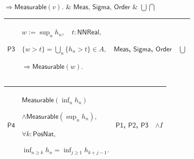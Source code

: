 \documentclass[11pt]{amsart}
\newlength{\FTCOneColumnBody}
\newlength{\FTCFourColumnBody}
\begin{document}
{\begin{tabular}
$\displaystyle \Rightarrow\textsf{Measurable}(v).$ & \hyperlink{def:Meas}{$\displaystyle \textsf{Meas}$}, \hyperlink{ax:Sigma}{$\displaystyle \textsf{Sigma}$}, \hyperlink{ax:Order}{$\displaystyle \textsf{Order}$} & $\displaystyle \bigcup\bigcap$\\ \hline
\end{tabular}%
\par\setlength{\parskip}{0pt}\nointerlineskip
\noindent
\begin{tabular}{|@{}>{\centering\arraybackslash}m{0.078431\FTCFourColumnBody}|>{\centering\arraybackslash}m{0.535947\FTCFourColumnBody}|>{\centering\arraybackslash}m{0.281045\FTCFourColumnBody}|>{\centering\arraybackslash}m{0.104575\FTCFourColumnBody}|}\hline
\hypertarget{proof:P3}{$\displaystyle \textsf{P3}$} & $\displaystyle w:=\sup_nh_n,\quad t:\textsf{NNReal},$\par
$\displaystyle \{w>t\}=\bigcup_n\{h_n>t\}\in A,$\par
$\displaystyle \Rightarrow\textsf{Measurable}(w).$ & \hyperlink{def:Meas}{$\displaystyle \textsf{Meas}$}, \hyperlink{ax:Sigma}{$\displaystyle \textsf{Sigma}$}, \hyperlink{ax:Order}{$\displaystyle \textsf{Order}$} & $\displaystyle \bigcup$\\ \hline
\end{tabular}%
\par\setlength{\parskip}{0pt}\nointerlineskip
\noindent
\begin{tabular}{|@{}>{\centering\arraybackslash}m{0.078431\FTCFourColumnBody}|>{\centering\arraybackslash}m{0.535947\FTCFourColumnBody}|>{\centering\arraybackslash}m{0.281045\FTCFourColumnBody}|>{\centering\arraybackslash}m{0.104575\FTCFourColumnBody}|}\hline
\hypertarget{proof:P4}{$\displaystyle \textsf{P4}$} & $\displaystyle \textsf{Measurable}(\inf_nh_n)$\par
$\displaystyle \land\textsf{Measurable}(\sup_nh_n),$\par
$\displaystyle \forall k:\textsf{PosNat},$\par
$\displaystyle \inf_{n\ge k}h_n=\inf_{j\ge1}h_{k+j-1}.$ & \hyperlink{proof:P1}{$\displaystyle \textsf{P1}$}, \hyperlink{proof:P2}{$\displaystyle \textsf{P2}$}, \hyperlink{proof:P3}{$\displaystyle \textsf{P3}$} & $\displaystyle \land I$\\ \hline
\end{tabular}%
\par\setlength{\parskip}{0pt}\nointerlineskip
\noindent
\begin{tabular}{|@{}>{\centering\arraybackslash}m{\FTCOneColumnBody}|}\hline

\end{tabular}}
\end{document}
